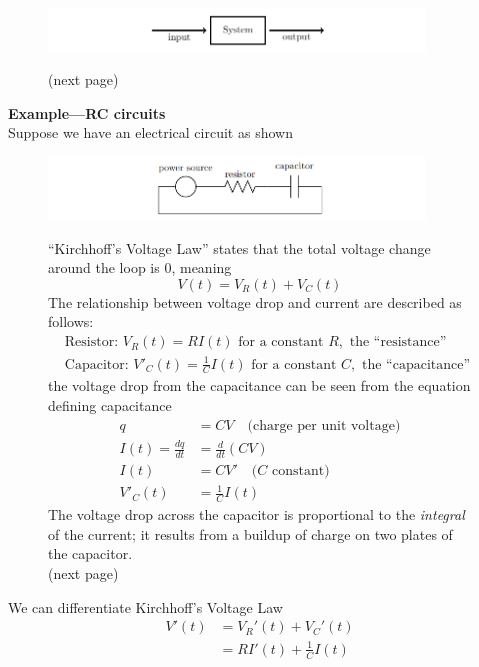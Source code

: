 \documentclass{report}
\begin{document}
\begin{figure}[h]
\begin{center}
\includegraphics[width=10cm]{5}\\
\end{center}
(next page)
\end{figure}
\newpage
\noindent\textbf{Example---RC circuits}\\
Suppose we have an electrical circuit as shown
\begin{figure}[h]
\begin{center}
\includegraphics[width=10cm]{6}\\
\end{center}
``Kirchhoff's Voltage Law'' states that the total voltage change around the loop is 0, meaning
\begin{equation*}
V(t)=V_R(t)+V_C(t)
\end{equation*}
The relationship between voltage drop and current are described as follows:
\begin{align*}
&\text{Resistor: }V_R(t)=RI(t)\text{ for a constant }R,\text{ the ``resistance''}\\
&\text{Capacitor: }V'_C(t)=\frac{1}{C}I(t)\text{ for a constant }C,\text{ the ``capacitance''}
\end{align*}
the voltage drop from the capacitance can be seen from
the equation defining capacitance
\begin{align*}
q&=CV\quad\text{(charge per unit voltage)}\\
I(t)=\frac{dq}{dt}&=\frac{d}{dt}(CV)\\
I(t)&=CV'\quad\text{($C$ constant)}\\
V'_C(t)&=\frac{1}{C}I(t)
\end{align*}
The voltage drop across the capacitor is proportional to the \textit{integral} of the current; it results from
a buildup of charge on two plates of the capacitor.\\
(next page)
\end{figure}
\newpage
\noindent We can differentiate Kirchhoff's Voltage Law 
\begin{align*}
V'(t)&=V_R'(t)+V_C'(t)\\
&=RI'(t)+\frac{1}{C}I(t)
\end{align*}
\end{document}
